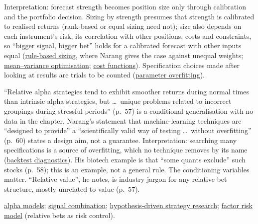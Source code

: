 \begin{qfmethod}
 Interpretation: forecast strength becomes position size only through calibration and the portfolio decision. Sizing by strength presumes that strength is calibrated to realised returns (rank-based or equal sizing need not); size also depends on each instrument's risk, its correlation with other positions, costs and constraints, so ``bigger signal, bigger bet'' holds for a calibrated forecast with other inputs equal (\hyperref[meth:rule-based-position-sizing]{rule-based sizing}, where Narang gives the case against unequal weights; \hyperref[mod:mean-variance-portfolio-optimisation]{mean--variance optimisation}; \hyperref[mod:portfolio-transaction-cost-function]{cost functions}). Specification choices made after looking at results are trials to be counted (\hyperref[pit:parameter-overfitting]{parameter overfitting}).

 ``Relative alpha strategies tend to exhibit smoother returns during normal times than intrinsic alpha strategies, but \dots\ unique problems related to incorrect groupings during stressful periods'' (p.~57) is a conditional generalisation with no data in the chapter. Narang's statement that machine-learning techniques are ``designed to provide'' a ``scientifically valid way of testing \dots\ without overfitting'' (p.~60) states a design aim, not a guarantee. Interpretation: searching many specifications is a source of overfitting, which no technique removes by its name (\hyperref[meth:backtest-evaluation-diagnostics]{backtest diagnostics}). His biotech example is that ``some quants exclude'' such stocks (p.~58); this is an example, not a general rule. The conditioning variables matter. ``Relative value'', he notes, is industry jargon for any relative bet structure, mostly unrelated to value (p.~57).

 \hyperref[def:alpha-model-taxonomy]{alpha models}; \hyperref[meth:alpha-signal-combination]{signal combination}; \hyperref[meth:hypothesis-driven-strategy-research]{hypothesis-driven strategy research}; \hyperref[mod:factor-risk-model]{factor risk model} (relative bets as risk control).

\end{qfmethod}
